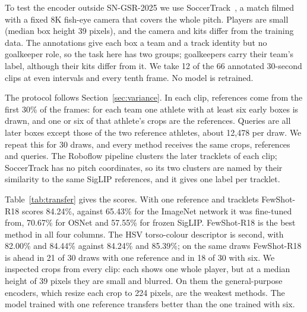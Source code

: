 \documentclass[10pt]{article}
\begin{document}
To test the encoder outside SN-GSR-2025 we use SoccerTrack~\cite{scott2022soccertrack}, a match filmed with a fixed 8K fish-eye camera that covers the whole pitch. Players are small (median box height 39 pixels), and the camera and kits differ from the training data. The annotations give each box a team and a track identity but no goalkeeper role, so the task here has two groups; goalkeepers carry their team's label, although their kits differ from it. We take 12 of the 66 annotated 30-second clips at even intervals and every tenth frame. No model is retrained.

The protocol follows Section~\ref{sec:variance}. In each clip, references come from the first 30\% of the frames: for each team one athlete with at least six early boxes is drawn, and one or six of that athlete's crops are the references. Queries are all later boxes except those of the two reference athletes, about 12,478 per draw. We repeat this for 30 draws, and every method receives the same crops, references and queries. The Roboflow pipeline clusters the later tracklets of each clip; SoccerTrack has no pitch coordinates, so its two clusters are named by their similarity to the same SigLIP references, and it gives one label per tracklet.

Table~\ref{tab:transfer} gives the scores. With one reference and tracklets FewShot-R18 scores 84.24\%, against 65.43\% for the ImageNet network it was fine-tuned from, 70.67\% for OSNet and 57.55\% for frozen SigLIP. FewShot-R18 is the best method in all four columns. The HSV torso-colour descriptor is second, with 82.00\% and 84.44\% against 84.24\% and 85.39\%; on the same draws FewShot-R18 is ahead in 21 of 30 draws with one reference and in 18 of 30 with six. We inspected crops from every clip: each shows one whole player, but at a median height of 39 pixels they are small and blurred. On them the general-purpose encoders, which resize each crop to 224 pixels, are the weakest methods. The model trained with one reference transfers better than the one trained with six.
\end{document}
